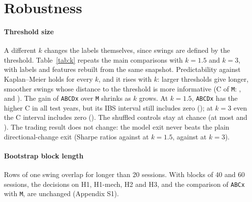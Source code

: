 \section{Robustness}\label{sec:robust}

\paragraph{Threshold size} A different $k$ changes the labels themselves, since swings are defined
by the threshold. Table~\ref{tab:k} repeats the main comparisons with $k=1.5$ and $k=3$, with labels
and features rebuilt from the same snapshot. Predictability against Kaplan--Meier holds for every
$k$, and it rises with $k$: larger thresholds give longer, smoother swings whose distance to the
threshold is more informative (C of \texttt{M}: \KOneFiveCM, \KTwoCM{} and \KThreeCM). The gain of
\texttt{ABCDx} over \texttt{M} shrinks as $k$ grows. At $k=1.5$, \texttt{ABCDx} has the higher C in
all \KOneFiveYearsAboveABCDxM{} test years, but its IBS interval still includes zero
(\KOneFiveDIBSABCDxM); at $k=3$ even the C interval includes zero (\KThreeDCABCDxM). The shuffled
controls stay at chance (at most \KOneFiveShuffledMax{} and \KThreeShuffledMax). The trading result
does not change: the model exit never beats the plain directional-change exit (Sharpe ratios
\KOneFiveSharpeModel{} against \KOneFiveSharpeDC{} at $k=1.5$, \KThreeSharpeModel{} against
\KThreeSharpeDC{} at $k=3$).

\begin{table}[!htbp]
\centering
\caption{Robustness to the threshold multiple $k$ in $\theta=k\,\mathrm{ATR}_{20}/P$, test years
2017--2026. Columns 2--5: year-stratified C. $\Delta C$ and $\Delta$IBS: \texttt{ABCDx} over
\texttt{M}, 95\% intervals from \PairedResamples{} resamples. Shuffled: highest mean C of the
shuffled-outcome controls. Beats KM: \texttt{ABCDx} against Kaplan--Meier under the decision rule.
Last three columns: Sharpe ratios of the model exit, the plain directional-change (DC) exit and
buy-and-hold (B\&H) at 0.40\% costs.}\label{tab:k}
\footnotesize
\setlength{\tabcolsep}{3.5pt}
\end{table}

\paragraph{Bootstrap block length} Rows of one swing overlap for longer than 20 sessions. With
blocks of 40 and 60 sessions, the decisions on H1, H1-mech, H2 and H3, and the comparison of
\texttt{ABCx} with \texttt{M}, are unchanged (Appendix S1).

